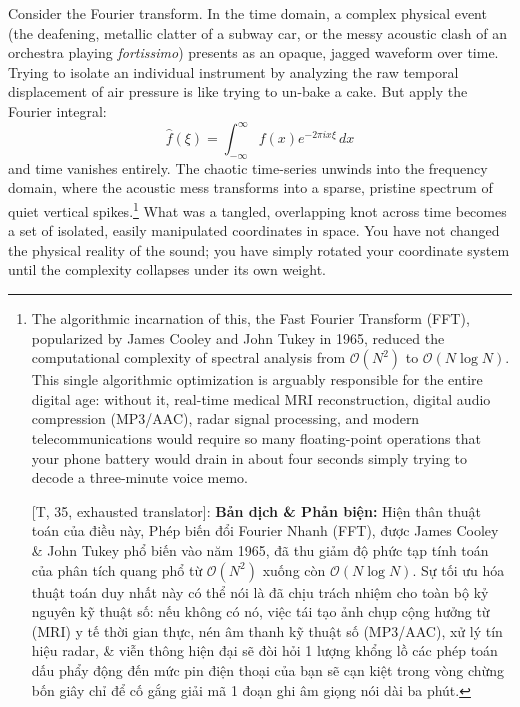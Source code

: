 \documentclass[11pt]{article}
\begin{document}
Consider the Fourier transform. In the time domain, a complex physical event (the deafening, metallic clatter of a subway car, or the messy acoustic clash of an orchestra playing \textit{fortissimo}) presents as an opaque, jagged waveform over time. Trying to isolate an individual instrument by analyzing the raw temporal displacement of air pressure is like trying to un-bake a cake. But apply the Fourier integral:
\[ \hat{f}(\xi) = \int_{-\infty}^{\infty} f(x) e^{-2\pi i x \xi} \, dx \]
and time vanishes entirely. The chaotic time-series unwinds into the frequency domain, where the acoustic mess transforms into a sparse, pristine spectrum of quiet vertical spikes.\footnote{The algorithmic incarnation of this, the Fast Fourier Transform (FFT), popularized by James Cooley and John Tukey in 1965, reduced the computational complexity of spectral analysis from $\mathcal{O}(N^2)$ to $\mathcal{O}(N \log N)$. This single algorithmic optimization is arguably responsible for the entire digital age: without it, real-time medical MRI reconstruction, digital audio compression (MP3/AAC), radar signal processing, and modern telecommunications would require so many floating-point operations that your phone battery would drain in about four seconds simply trying to decode a three-minute voice memo.
	
	\textsf{[T, 35, exhausted translator]:} \textbf{Bản dịch \& Phản biện:} Hiện thân thuật toán của điều này, Phép biến đổi Fourier Nhanh (FFT), được James Cooley \& John Tukey phổ biến vào năm 1965, đã thu giảm độ phức tạp tính toán của phân tích quang phổ từ $\mathcal{O}(N^2)$ xuống còn $\mathcal{O}(N \log N)$. Sự tối ưu hóa thuật toán duy nhất này có thể nói là đã chịu trách nhiệm cho toàn bộ kỷ nguyên kỹ thuật số: nếu không có nó, việc tái tạo ảnh chụp cộng hưởng từ (MRI) y tế thời gian thực, nén âm thanh kỹ thuật số (MP3/AAC), xử lý tín hiệu radar, \& viễn thông hiện đại sẽ đòi hỏi 1 lượng khổng lồ các phép toán dấu phẩy động đến mức pin điện thoại của bạn sẽ cạn kiệt trong vòng chừng bốn giây chỉ để cố gắng giải mã 1 đoạn ghi âm giọng nói dài ba phút.} What was a tangled, overlapping knot across time becomes a set of isolated, easily manipulated coordinates in space. You have not changed the physical reality of the sound; you have simply rotated your coordinate system until the complexity collapses under its own weight.
\end{document}
